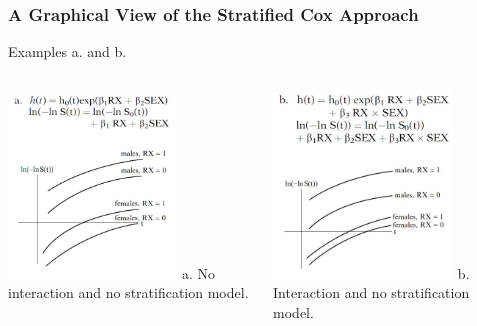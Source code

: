\documentclass{beamer}
\theoremstyle{definition}
\begin{document}
\begin{frame}
\frametitle{A Graphical View of the Stratified Cox Approach}
\begin{block}{Examples a. and b.}
\begin{columns}
    \begin{column}{0.48\textwidth}
        \includegraphics[width =\textwidth, height=5cm]{CH5_G1.JPG}
        a. No interaction and no stratification model.
    \end{column}
    \hspace{-10pt}
    \begin{column}{0.48\textwidth}
         \includegraphics[width =\textwidth, height=5cm]{CH5_G2.JPG}
         b. Interaction and no stratification model.
    \end{column}
\end{columns}
\end{block}
\end{frame}
\end{document}

